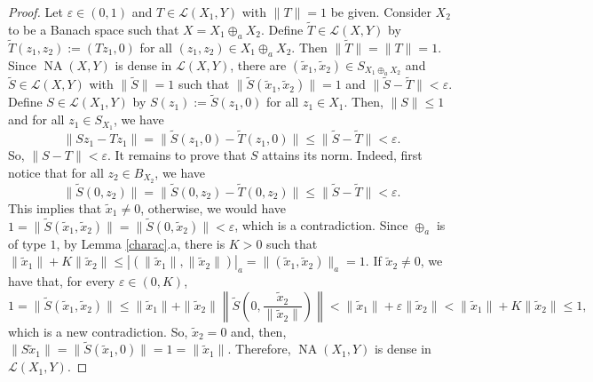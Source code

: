 \documentclass[10pt,a4paper]{amsart}
\theoremstyle{plain}
\theoremstyle{definition}
\newcommand{\eps}{\varepsilon}
\DeclareMathOperator{\NA}{NA}
\renewcommand{\leq}{\leqslant}
\begin{document}
\begin{proof} Let $\eps \in (0, 1)$ and $T \in \mathcal{L}(X_1, Y)$ with $\|T\| = 1$ be given. Consider $X_2$ to be a Banach space such that $X = X_1 \oplus_a X_2$. Define $\widetilde{T} \in \mathcal{L}(X, Y)$ by $\widetilde{T}(z_1, z_2) := (Tz_1, 0)$ for all $(z_1, z_2) \in X_1 \oplus_a X_2$. Then $\|\widetilde{T}\| = \|T\| = 1$. Since $\NA(X, Y)$ is dense in $\mathcal{L}(X, Y)$, there are $(\widetilde{x}_1, \widetilde{x}_2) \in S_{X_1 \oplus_a X_2}$ and $\widetilde{S} \in \mathcal{L}(X, Y)$ with $\|\widetilde{S}\| = 1$ such that $\|\widetilde{S}(\widetilde{x}_1, \widetilde{x}_2)\| = 1$ and $\|\widetilde{S} - \widetilde{T}\| < \eps$. Define $S \in \mathcal{L}(X_1, Y)$ by $S(z_1) := \widetilde{S}(z_1, 0)$ for all $z_1 \in X_1$. Then, $\|S\| \leq 1$ and for all $z_1 \in S_{X_1}$, we have
	\begin{equation*}
	\|Sz_1 - Tz_1\| = \|\widetilde{S}(z_1, 0) - \widetilde{T}(z_1, 0)\| \leq \|\widetilde{S} - \widetilde{T}\| < \eps.
	\end{equation*}
	So, $\|S - T\| < \eps$. It remains to prove that $S$ attains its norm. Indeed, first notice that for all $z_2 \in B_{X_2}$, we have
	\begin{equation*}
	\|\widetilde{S}(0, z_2)\| = \| \widetilde{S}(0, z_2) - \widetilde{T}(0, z_2)\| \leq \|\widetilde{S} - \widetilde{T}\| < \eps.
	\end{equation*}	
	This implies that $\widetilde{x}_1 \not= 0$, otherwise, we would have $1 = \|\widetilde{S}(\widetilde{x}_1, \widetilde{x}_2)\| = \|\widetilde{S}(0, \widetilde{x}_2)\| < \eps$, which is a contradiction.	Since $\oplus_a$ is of type $1$, by Lemma \ref{charac}.a, there is $K > 0$ such that $\|\widetilde{x}_1\| + K \|\widetilde{x}_2\| \leq |(\|\widetilde{x}_1\|, \|\widetilde{x}_2\|)|_a = \| (\widetilde{x}_1, \widetilde{x}_2)\|_a = 1$. If $\widetilde{x}_2 \not= 0$, we have that, for every $\eps \in (0, K)$,
	\begin{equation*}
	1 = \| \widetilde{S}(\widetilde{x}_1, \widetilde{x}_2)\| \leq \|\widetilde{x}_1\| + \|\widetilde{x}_2\| \left\| \widetilde{S} \left( 0, \frac{\widetilde{x}_2}{\|\widetilde{x}_2\|} \right)\right\| < \|\widetilde{x}_1\| + \eps \| \widetilde{x}_2 \| < \|\widetilde{x}_1\| + K \|\widetilde{x}_2\| \leq 1,
	\end{equation*}
	which is a new contradiction. So, $\widetilde{x}_2 = 0$ and, then, $\|S\widetilde{x}_1\| = \| \widetilde{S}(\widetilde{x}_1, 0)\| = 1 = \|\widetilde{x}_1\|$. Therefore, $\NA(X_1, Y)$ is dense in $\mathcal{L}(X_1, Y)$.	
\end{proof}
\end{document}
